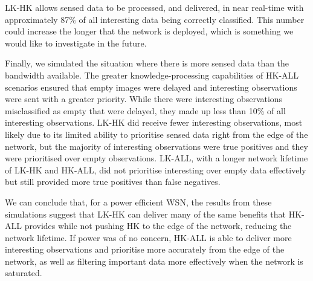 LK-HK allows sensed data to be processed, and delivered, in near real-time with approximately 87\% of all interesting data being correctly classified. This number could increase the longer that the network is deployed, which is something we would like to investigate in the future.

Finally, we simulated the situation where there is more sensed data than the bandwidth available. The greater knowledge-processing capabilities of HK-ALL scenarios ensured that empty images were delayed and interesting observations were sent with a greater priority. While there were interesting observations misclassified as empty that were delayed, they made up less than 10\% of all interesting observations. LK-HK did receive fewer interesting observations, most likely due to its limited ability to prioritise sensed data right from the edge of the network, but the majority of interesting observations were true positives and they were prioritised over empty observations. LK-ALL, with a longer network lifetime of LK-HK and HK-ALL, did not prioritise interesting over empty data effectively but still provided more true positives than false negatives.

We can conclude that, for a power efficient WSN, the results from these simulations suggest that LK-HK can deliver many of the same benefits that HK-ALL provides while not pushing HK to the edge of the network, reducing the network lifetime. If power was of no concern, HK-ALL is able to deliver more interesting observations and prioritise more accurately from the edge of the network, as well as filtering important data more effectively when the network is saturated.







































